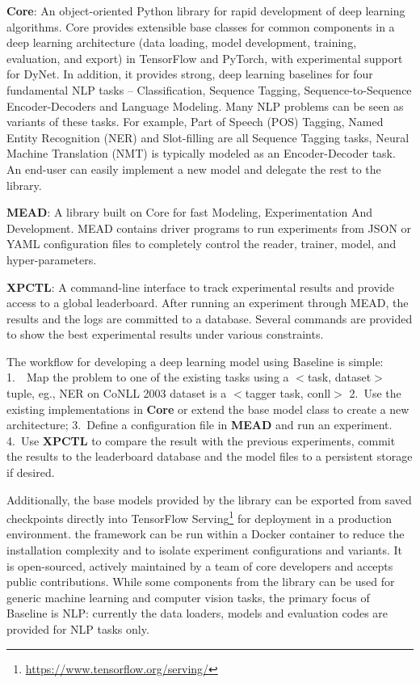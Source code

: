 \documentclass[11pt,a4paper]{article}
\begin{document}
\textbf{Core}: An object-oriented Python library for rapid development of deep learning algorithms. Core provides extensible base classes for common components in a deep learning architecture (data loading, model development, training, evaluation, and export) in TensorFlow and PyTorch, with experimental support for DyNet. In addition, it provides strong, deep learning baselines for four fundamental NLP tasks -- Classification, Sequence Tagging, Sequence-to-Sequence Encoder-Decoders and Language Modeling. Many NLP problems can be seen as variants of these tasks. For example, Part of Speech (POS) Tagging, Named Entity Recognition (NER) and Slot-filling are all Sequence Tagging tasks, Neural Machine Translation (NMT) is typically modeled as an Encoder-Decoder task. An end-user can easily implement a new model and delegate the rest to the library.

\textbf{MEAD}: A library built on Core for fast Modeling, Experimentation And Development. MEAD contains driver programs to run experiments from JSON or YAML configuration files to completely control the reader, trainer, model, and hyper-parameters. 
  
\textbf{XPCTL}: A command-line interface to track experimental results and provide access to a global leaderboard. After running an experiment through MEAD, the results and the logs are committed to a database. Several commands are provided to show the best experimental results under various constraints. 

The workflow for developing a deep learning model using Baseline is simple: 1.~~Map the problem to one of the existing tasks using a $<$task, dataset$>$ tuple, eg., NER on CoNLL 2003 dataset is a $<$tagger task, conll$>$ 2.~Use the existing implementations in \textbf{Core} or extend the base model class to create a new architecture; 3.~Define a configuration file in \textbf{MEAD} and run an experiment. 4.~Use \textbf{XPCTL} to compare the result with the previous experiments, commit the results to the leaderboard database and the model files to a persistent storage if desired.

Additionally, the base models provided by the library can be exported from saved checkpoints directly into TensorFlow Serving\footnote{\url{https://www.tensorflow.org/serving/}} for deployment in a production environment. the framework can be run within a Docker container to reduce the installation complexity and to isolate experiment configurations and variants. It is open-sourced, actively maintained by a team of core developers and accepts public contributions. While some components from the library can be used for generic machine learning and computer vision tasks, the primary focus of Baseline is NLP: currently the data loaders, models and evaluation codes are provided for NLP tasks only.    
\end{document}
